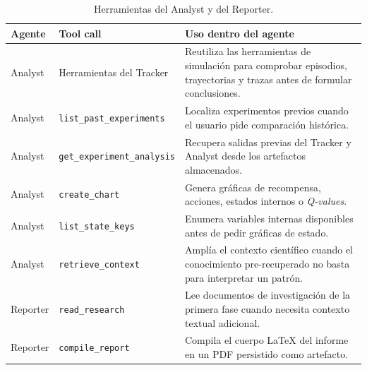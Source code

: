 \begin{table}[H]
\begin{center}
{\scriptsize
\setlength{\tabcolsep}{6pt}
\renewcommand{\arraystretch}{1.12}
\begin{tabular}{|>{\raggedright\arraybackslash}p{2.3cm}|>{\raggedright\arraybackslash}p{3.2cm}|>{\raggedright\arraybackslash}p{5.9cm}|} \hline
\textbf{Agente} & \textbf{Tool call} & \textbf{Uso dentro del agente} \\ \hline
Analyst & Herramientas del Tracker & Reutiliza las herramientas de simulación para comprobar episodios, trayectorias y trazas antes de formular conclusiones. \\ \hline
Analyst & \texttt{list\_past\_experiments} & Localiza experimentos previos cuando el usuario pide comparación histórica. \\ \hline
Analyst & \texttt{get\_\allowbreak experiment\_\allowbreak analysis} & Recupera salidas previas del Tracker y Analyst desde los artefactos almacenados. \\ \hline
Analyst & \texttt{create\_chart} & Genera gráficas de recompensa, acciones, estados internos o \textit{Q-values}. \\ \hline
Analyst & \texttt{list\_state\_keys} & Enumera variables internas disponibles antes de pedir gráficas de estado. \\ \hline
Analyst & \texttt{retrieve\_context} & Amplía el contexto científico cuando el conocimiento pre-recuperado no basta para interpretar un patrón. \\ \hline
Reporter & \texttt{read\_research} & Lee documentos de investigación de la primera fase cuando necesita contexto textual adicional. \\ \hline
Reporter & \texttt{compile\_report} & Compila el cuerpo LaTeX del informe en un PDF persistido como artefacto. \\ \hline
\end{tabular}
}
\caption[Herramientas del Analyst y Reporter]{Herramientas del Analyst y del
Reporter.}
\label{tab:toolcalls-analyst-reporter}
\end{center}
\end{table}
